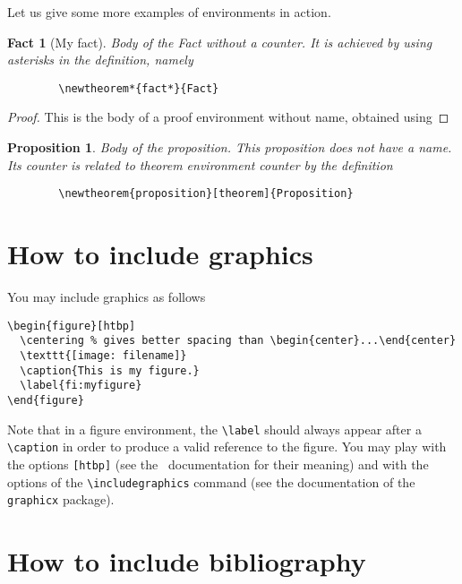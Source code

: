 \documentclass{jphilart}
\newtheorem*{fact*}{Fact} %
\newtheorem{proposition}[theorem]{Proposition} %
\begin{document}
Let us give some more examples of environments in action.

\begin{fact*}[My fact]
    Body of the Fact without a counter.
    It is achieved by using asterisks in the definition, namely
    \begin{verbatim}
        \newtheorem*{fact*}{Fact}\end{verbatim}
\end{fact*}

\begin{proof}
    This is the body of a proof environment without name, obtained using
\end{proof}

\begin{proposition}
    Body of the proposition. This proposition does not have a name.
    Its counter is related to theorem environment counter by the definition
    \begin{verbatim}
        \newtheorem{proposition}[theorem]{Proposition}\end{verbatim}
\end{proposition}

\section{How to include graphics}

You may include graphics as follows
\begin{small}
\begin{verbatim}
\begin{figure}[htbp]
  \centering % gives better spacing than \begin{center}...\end{center}
  \texttt{[image: filename]}
  \caption{This is my figure.}
  \label{fi:myfigure}
\end{figure}\end{verbatim}
\end{small}

Note that in a figure environment, the \verb+\label+ should always appear
after a \verb+\caption+ in order to produce a valid reference to the figure.
You may play with the options \verb+[htbp]+ (see the \LaTeXe\ documentation
for their meaning) and with the options of the \verb+\includegraphics+ command
(see the documentation of the \texttt{graphicx} package).

\section{How to include bibliography}
\end{document}
